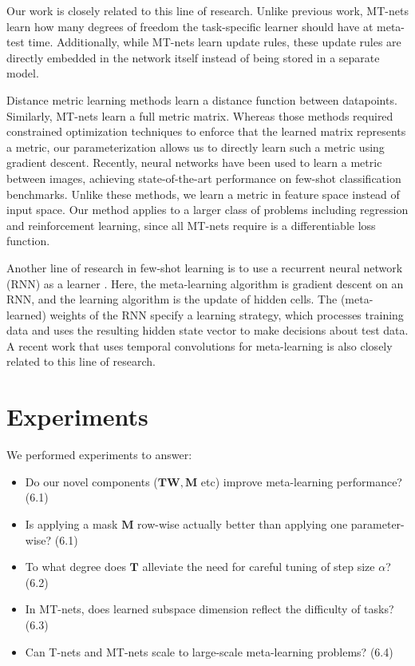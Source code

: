 \documentclass{article}
\newcommand{\0}{{\bf 0}}
\newcommand{\W}{\mathbf{W}}
\newcommand{\T}{\mathbf{T}}
\newcommand{\M}{\mathbf{M}}
\newcommand{\mask}{\M}
\begin{document}
Our work is closely related to this line of research.
Unlike previous work, MT-nets learn how many degrees of freedom the task-specific learner should have at meta-test time.
Additionally, while MT-nets learn update rules, these update rules are directly embedded in the network itself instead of being stored in a separate model.

Distance metric learning \cite{XingEP2002nips, WeinbergerKQ2005nips} methods learn a distance function between datapoints.
Similarly, MT-nets learn a full metric matrix.
Whereas those methods required constrained optimization techniques to enforce that the learned matrix represents a metric,
our parameterization allows us to directly learn such a metric using gradient descent.
Recently, neural networks have been used to learn a metric between images\cite{KochG2015icml, VinyalsO2016nips, SnellJ2017nips},
achieving state-of-the-art performance on few-shot classification benchmarks.
Unlike these methods, we learn a metric in feature space instead of input space.
Our method applies to a larger class of problems including regression and reinforcement learning, since all MT-nets require is a differentiable loss function.

Another line of research in few-shot learning is to use a recurrent neural network (RNN) as a learner \cite{SantoroA2016icml, MunkhdalaiT2017icml}.
Here, the meta-learning algorithm is gradient descent on an RNN, and the learning algorithm is the update of hidden cells.
The (meta-learned) weights of the RNN specify a learning strategy, which processes training data and uses the resulting hidden state vector to make decisions about test data.
A recent work that uses temporal convolutions for meta-learning\cite{Mishra2018iclr} is also closely related to this line of research.

\iffalse
The concept of fast weights\cite{fast} is also related to our method.
The idea here is that in addition to ordinary (slow) weights, having fast weights that rapidly activate and decay can result in robust yet adaptive learning.
This paper gives some evidence from physiology which suggests that similar mechanisms are inside the human brain as well.
\fi


\section{Experiments}
We performed experiments to answer:
\begin{itemize}
\setlength\itemsep{0em}
	\item Do our novel components ($\T \W, \mask$ etc) improve meta-learning performance? (6.1)
	\item Is applying a mask $\mask$ row-wise actually better than applying one parameter-wise? (6.1)
	\item To what degree does $\T$ alleviate the need for careful tuning of step size $\alpha$? (6.2)
	\item In MT-nets, does learned subspace dimension reflect the difficulty of tasks? (6.3)
	\item Can T-nets and MT-nets scale to large-scale meta-learning problems? (6.4)
\end{itemize}
\end{document}
